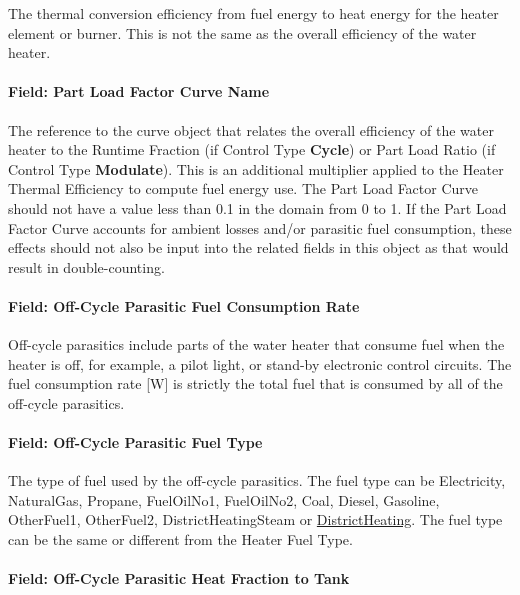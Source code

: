 The thermal conversion efficiency from fuel energy to heat energy for the heater element or burner. This is not the same as the overall efficiency of the water heater.

\paragraph{Field: Part Load Factor Curve Name}\label{field-part-load-factor-curve-name}

The reference to the curve object that relates the overall efficiency of the water heater to the Runtime Fraction (if Control Type \textbf{Cycle}) or Part Load Ratio (if Control Type \textbf{Modulate}). This is an additional multiplier applied to the Heater Thermal Efficiency to compute fuel energy use. The Part Load Factor Curve should not have a value less than 0.1 in the domain from 0 to 1. If the Part Load Factor Curve accounts for ambient losses and/or parasitic fuel consumption, these effects should not also be input into the related fields in this object as that would result in double-counting.

\paragraph{Field: Off-Cycle Parasitic Fuel Consumption Rate}\label{field-off-cycle-parasitic-fuel-consumption-rate}

Off-cycle parasitics include parts of the water heater that consume fuel when the heater is off, for example, a pilot light, or stand-by electronic control circuits. The fuel consumption rate {[}W{]} is strictly the total fuel that is consumed by all of the off-cycle parasitics.

\paragraph{Field: Off-Cycle Parasitic Fuel Type}\label{field-off-cycle-parasitic-fuel-type}

The type of fuel used by the off-cycle parasitics. The fuel type can be Electricity, NaturalGas, Propane, FuelOilNo1, FuelOilNo2, Coal, Diesel, Gasoline, OtherFuel1, OtherFuel2, DistrictHeatingSteam or \hyperref[districtheating]{DistrictHeating}. The fuel type can be the same or different from the Heater Fuel Type.

\paragraph{Field: Off-Cycle Parasitic Heat Fraction to Tank}\label{field-off-cycle-parasitic-heat-fraction-to-tank}

